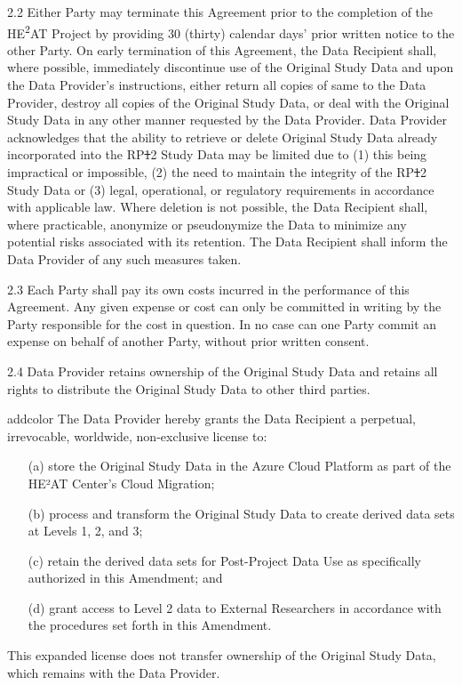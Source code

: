 \documentclass[12pt,letterpaper]{article}
\newcommand{\deleted}[1]{\textcolor{deletecolor}{\sout{#1}}}
\newcommand{\added}[1]{\textcolor{addcolor}{#1}}
\newenvironment{addedtext}{\begin{color}{addcolor}}{\end{color}}
\begin{document}
2.2 Either Party may terminate this Agreement prior to the completion of the HE\textsuperscript{2}AT Project by providing 30 (thirty) calendar days' prior written notice to the other Party. On early termination of this Agreement, the Data Recipient shall, where possible, immediately discontinue use of the Original Study Data and upon the Data Provider's instructions, either return all copies of same to the Data Provider, destroy all copies of the Original Study Data, or deal with the Original Study Data in any other manner requested by the Data Provider. Data Provider acknowledges that the ability to retrieve or delete Original Study Data already incorporated into the RP\deleted{1}\added{2} Study Data may be limited due to (1) this being impractical or impossible, (2) the need to maintain the integrity of the RP\deleted{1}\added{2} Study Data or (3) legal, operational, or regulatory requirements in accordance with applicable law. Where deletion is not possible, the Data Recipient shall, where practicable, anonymize or pseudonymize the Data to minimize any potential risks associated with its retention. The Data Recipient shall inform the Data Provider of any such measures taken.

2.3 Each Party shall pay its own costs incurred in the performance of this Agreement. Any given expense or cost can only be committed in writing by the Party responsible for the cost in question. In no case can one Party commit an expense on behalf of another Party, without prior written consent.

2.4 Data Provider retains ownership of the Original Study Data and retains all rights to distribute the Original Study Data to other third parties. 

\begin{addedtext}
The Data Provider hereby grants the Data Recipient a perpetual, irrevocable, worldwide, non-exclusive license to:
\begin{enumerate}
\item[(a)] store the Original Study Data in the Azure Cloud Platform as part of the HE²AT Center's Cloud Migration;
\item[(b)] process and transform the Original Study Data to create derived data sets at Levels 1, 2, and 3;
\item[(c)] retain the derived data sets for Post-Project Data Use as specifically authorized in this Amendment; and
\item[(d)] grant access to Level 2 data to External Researchers in accordance with the procedures set forth in this Amendment.
\end{enumerate}

This expanded license does not transfer ownership of the Original Study Data, which remains with the Data Provider.
\end{addedtext}
\end{document}
